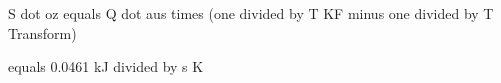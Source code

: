 S dot oz equals Q dot aus times (one divided by T KF minus one divided by T Transform)

equals 0.0461 kJ divided by s K